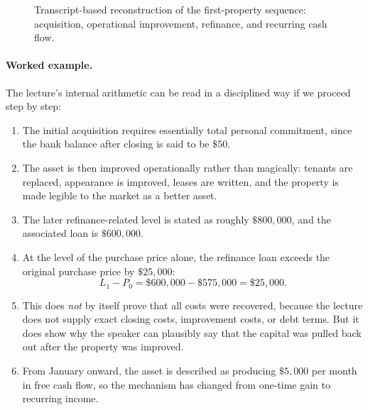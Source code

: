 \begin{figure}[h]
\centering
{}
\caption{Transcript-based reconstruction of the first-property sequence: acquisition, operational improvement, refinance, and recurring cash flow.}
\end{figure}

\paragraph{Worked example.}
The lecture's internal arithmetic can be read in a disciplined way if we proceed step by step:
\begin{enumerate}
\item The initial acquisition requires essentially total personal commitment, since the bank balance after closing is said to be \(\$50\).
\item The asset is then improved operationally rather than magically: tenants are replaced, appearance is improved, leases are written, and the property is made legible to the market as a better asset.
\item The later refinance-related level is stated as roughly \(\$800{,}000\), and the associated loan is \(\$600{,}000\).
\item At the level of the purchase price alone, the refinance loan exceeds the original purchase price by \(\$25{,}000\):
\begin{equation}
L_1 - P_0 = \$600{,}000 - \$575{,}000 = \$25{,}000.
\end{equation}
\item This does \emph{not} by itself prove that all costs were recovered, because the lecture does not supply exact closing costs, improvement costs, or debt terms. But it does show why the speaker can plausibly say that the capital was pulled back out after the property was improved.
\item From January onward, the asset is described as producing \(\$5{,}000\) per month in free cash flow, so the mechanism has changed from one-time gain to recurring income.
\end{enumerate}

